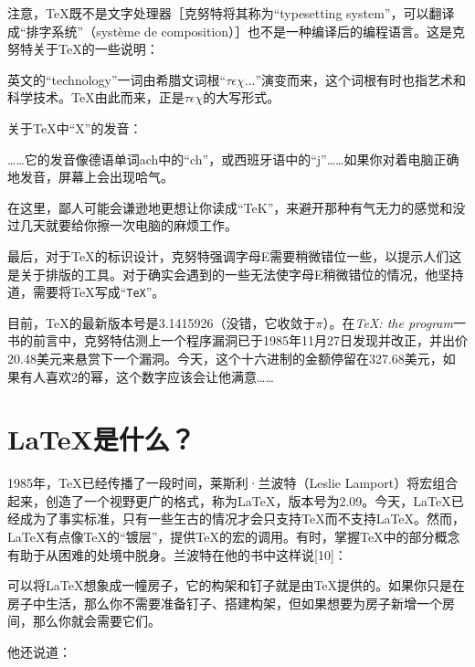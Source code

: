注意，\TeX 既不是文字处理器［克努特将其称为“typesetting system”，可以翻译成“排字系统”（système de composition）］也不是一种编译后的编程语言。这是克努特关于\TeX 的一些说明：

\begin{origincitation}
    英文的“technology”一词由希腊文词根“$ \tau\epsilon\chi...$”演变而来，这个词根有时也指艺术和科学技术。\TeX 由此而来，正是$ \tau\epsilon\chi$的大写形式。
\end{origincitation}

关于\TeX 中“X”的发音：

\begin{origincitation}
    ……它的发音像德语单词ach中的“ch”，或西班牙语中的“j”……如果你对着电脑正确地发音，屏幕上会出现哈气。
\end{origincitation}

在这里，鄙人可能会谦逊地更想让你读成“TeK”，来避开那种有气无力的感觉和没过几天就要给你擦一次电脑的麻烦工作。

最后，对于\TeX 的标识设计，克努特强调字母E需要稍微错位一些，以提示人们这是关于排版的工具。对于确实会遇到的一些无法使字母E稍微错位的情况，他坚持道，需要将\TeX 写成“\texttt{TeX}”。

目前，\TeX 的最新版本号是3.1415926（没错，它收敛于$\pi$）。在\emph{\TeX : the program}一书的前言中，克努特估测上一个程序漏洞已于1985年11月27日发现并改正，并出价20.48美元来悬赏下一个漏洞。今天，这个十六进制的金额停留在327.68美元，如果有人喜欢2的幂，这个数字应该会让他满意……

\section*{\LaTeX 是什么？}

1985年，\TeX 已经传播了一段时间，莱斯利·兰波特（Leslie Lamport）将宏组合起来，创造了一个视野更广的格式，称为\LaTeX ，版本号为2.09。今天，\LaTeX 已经成为了事实标准，只有一些玍古的情况才会只支持\TeX 而不支持\LaTeX 。然而，\LaTeX 有点像\TeX 的“镀层”，提供\TeX 的宏的调用。有时，掌握\TeX 中的部分概念有助于从困难的处境中脱身。兰波特在他的书中这样说[10]：%

\begin{origincitation}
    可以将\LaTeX 想象成一幢房子，它的构架和钉子就是由\TeX 提供的。如果你只是在房子中生活，那么你不需要准备钉子、搭建构架，但如果想要为房子新增一个房间，那么你就会需要它们。
\end{origincitation}

他还说道：

